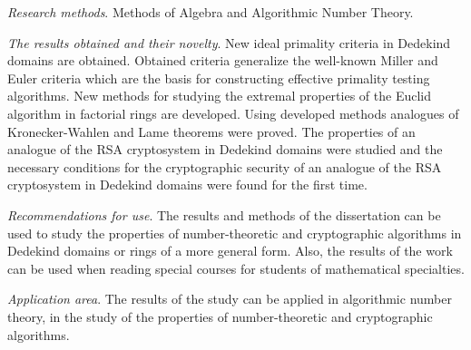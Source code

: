 \documentclass[_00_autoref.tex]{subfiles}
\begin{document}
\textit{Research methods}.
Methods of Algebra and Algorithmic Number Theory.

\textit{The results obtained and their novelty}.
New ideal primality criteria in Dedekind domains are obtained.
Obtained criteria generalize the well-known Miller and Euler criteria which are the basis for constructing effective primality testing algorithms.
New methods for studying the extremal properties of the Euclid algorithm in factorial rings are developed.
Using developed methods analogues of Kronecker-Wahlen and Lame theorems were proved.
The properties of an analogue of the RSA cryptosystem in Dedekind domains were studied and the necessary conditions for the cryptographic security of an analogue of the RSA cryptosystem in Dedekind domains were found for the first time.

\textit{Recommendations for use}.
The results and methods of the dissertation can be used to study the properties of number-theoretic and cryptographic algorithms in Dedekind domains or rings of a more general form.
Also, the results of the work can be used when reading special courses for students of mathematical specialties.

\textit{Application area}.
The results of the study can be applied in algorithmic number theory, in the study of the properties of number-theoretic and cryptographic algorithms.
\end{document}
